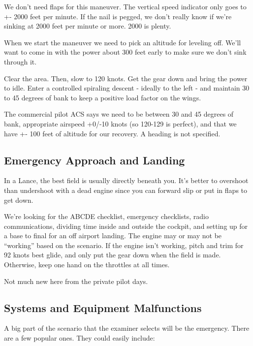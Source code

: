 We don't need flaps for this maneuver. The vertical speed indicator only goes to +- 2000 feet per minute. If the nail is pegged, we don't really know if we're sinking at 2000 feet per minute or more. 2000 is plenty.

When we start the maneuver we need to pick an altitude for leveling off. We'll want to come in with the power about 300 feet early to make sure we don't sink through it.

Clear the area. Then, slow to 120 knots. Get the gear down and bring the power to idle. Enter a controlled spiraling descent - ideally to the left - and maintain 30 to 45 degrees of bank to keep a positive load factor on the wings.

The commercial pilot ACS says we need to be between 30 and 45 degrees of bank, appropriate airspeed +0/-10 knots (so 120-129 is perfect), and that we have +- 100 feet of altitude for our recovery. A heading is not specified.

\subsection{Emergency Approach and Landing}

In a Lance, the best field is usually directly beneath you. It's better to overshoot than undershoot with a dead engine since you can forward slip or put in flaps to get down.

We're looking for the ABCDE checklist, emergency checklists, radio communications, dividing time inside and outside the cockpit, and setting up for a base to final for an off airport landing. The engine may or may not be ``working'' based on the scenario. If the engine isn't working, pitch and trim for 92 knots best glide, and only put the gear down when the field is made. Otherwise, keep one hand on the throttles at all times.

Not much new here from the private pilot days.

\subsection{Systems and Equipment Malfunctions}

A big part of the scenario that the examiner selects will be the emergency. There are a few popular ones. They could easily include:

